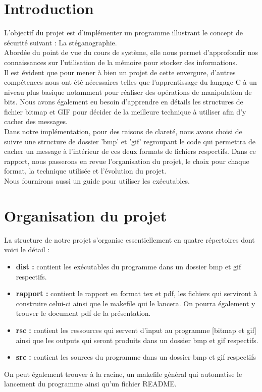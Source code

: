 \section{Introduction}
L'objectif du projet est d'implémenter un programme illustrant le concept de sécurité suivant : La stéganographie.\\
Abordée du point de vue du cours de système, elle nous permet d'approfondir nos connaissances sur l'utilisation de la mémoire
pour stocker des informations.\\Il est évident que pour mener à bien un projet de cette envergure, d'autres compétences nous ont été nécessaires
telles que l'apprentissage du langage C à un niveau plus basique notamment pour réaliser des opérations de manipulation de bits.
Nous avons également eu besoin d'apprendre en détails les structures de fichier bitmap et GIF pour décider de la meilleure technique à
utiliser afin d'y cacher des messages.\\
Dans notre implémentation, pour des raisons de clareté, nous avons choisi de suivre une structure de dossier 'bmp' et 'gif' regroupant
le code qui permettra de cacher un message à l'intérieur de ces deux formats de fichiers respectifs.
Dans ce rapport, nous passerons en revue l'organisation du projet, le choix pour chaque format, la technique utilisée et 
l'évolution du projet.\\ Nous fournirons aussi un guide pour utiliser les exécutables. 

\vspace{1.5cm}


\section{Organisation du projet}
La structure de notre projet s'organise essentiellement en quatre répertoires dont voici le détail :\\ 

\begin{itemize}
    \item \textbf{dist :} contient les exécutables du programme dans un dossier bmp et gif respectifs.
    \item \textbf{rapport :} contient le rapport en format tex et pdf, les fichiers qui serviront à construire celui-ci 
    ainsi que le makefile qui le lancera. On pourra également y trouver le document pdf de la présentation.
    \item \textbf{rsc :} contient les ressources qui servent d'input au programme [bitmap et gif] ainsi que les outputs 
    qui seront produits dans un dossier bmp et 
    gif respectifs.
    \item \textbf{src :} contient les sources du programme dans un dossier bmp et gif respectifs\\
\end{itemize}
On peut également trouver à la racine, un makefile général qui automatise le lancement du programme ainsi qu'un fichier README.


